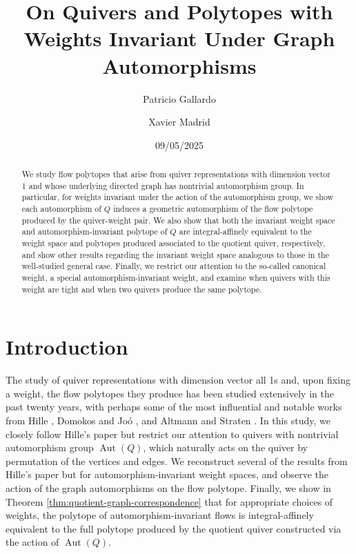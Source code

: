 \documentclass[12pt]{amsart}
\title{
On Quivers and Polytopes with Weights Invariant Under Graph Automorphisms
}
\author{Patricio Gallardo}
\author{Xavier Madrid}
\date{09/05/2025}
\theoremstyle{plain}
\theoremstyle{definition}
\DeclareMathOperator{\aut}{Aut}
\begin{document}
\begin{abstract}
    We study flow polytopes that arise from quiver representations with dimension vector 1 and whose underlying directed graph has nontrivial automorphism group. In particular, for weights invariant under the action of the automorphism group, we show each automorphism of $Q$ induces a geometric automorphism of the flow polytope produced by the quiver-weight pair. We also show that both the invariant weight space and automorphism-invariant polytope of $Q$ are integral-affinely equivalent to the weight space and polytopes produced associated to the quotient quiver, respectively, and show other results regarding the invariant weight space analogous to those in the well-studied general case. Finally, we restrict our attention to the so-called canonical weight, a special automorphism-invariant weight, and examine when quivers with this weight are tight and when two quivers produce the same polytope.

\end{abstract}
\maketitle

\section{Introduction}

\noindent The study of quiver representations with dimension vector all 1s and, upon fixing a weight, the flow polytopes they produce has been studied extensively in the past twenty years, with perhaps some of the most influential and notable works from Hille \cite{hille2003quivers}, Domokos and Joó \cite{domokos2016equations}, and Altmann and Straten \cite{Altmann2009}. In this study, we closely follow Hille's paper but restrict our attention to quivers with nontrivial automorphism group $\aut(Q)$, which naturally acts on the quiver by permutation of the vertices and edges. We reconstruct several of the results from Hille's paper but for automorphism-invariant weight spaces, and observe the action of the graph automorphisms on the flow polytope. Finally, we show in Theorem \ref{thm:quotient-graph-correspondence} that for appropriate choices of weights, the polytope of automorphism-invariant flows is integral-affinely equivalent to the full polytope produced by the quotient quiver constructed via the action of $\aut(Q)$. 
\end{document}
